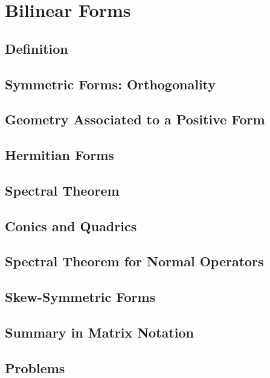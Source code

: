 \chapter{Bilinear Forms}
\section{Definition}
\section{Symmetric Forms: Orthogonality}
\section{Geometry Associated to a Positive Form}
\section{Hermitian Forms}
\section{Spectral Theorem}
\section{Conics and Quadrics}
\section{Spectral Theorem for Normal Operators}
\section{Skew-Symmetric Forms}
\section{Summary in Matrix Notation}
\section{Problems}